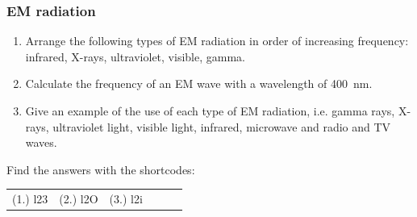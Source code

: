                \subsubsection*{EM radiation}
            \nopagebreak
      \label{m38778*id188768}\begin{enumerate}[noitemsep, label=\textbf{\arabic*}. ] 
            \label{m38778*uid10}\item Arrange the following types of EM radiation in order of increasing frequency: infrared, X-rays, ultraviolet, visible, gamma.\newline
\label{m38778*uid11}\item Calculate the frequency of an EM wave with a wavelength of 400~nm.\newline
\label{m38778*uid12}\item Give an example of the use of each type of EM radiation, i.e. gamma rays, X-rays, ultraviolet light, visible light, infrared, microwave and radio and TV waves.\newline
\end{enumerate}
    \label{m38778*cid6}
\par {} Find the answers with the shortcodes:
 \par \begin{tabular}[h]{cccccc}
 (1.) l23  &  (2.) l2O  &  (3.) l2i  & \end{tabular}


